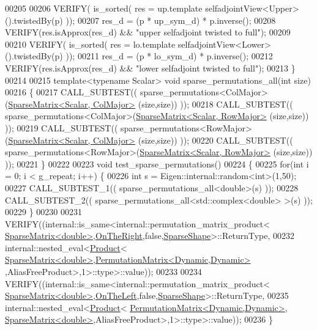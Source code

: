 \begin{DoxyCode}
00205   
00206   VERIFY( is\_sorted( res = up.template selfadjointView<Upper>().twistedBy(p) ));
00207   res\_d = (p * up\_sym\_d) * p.inverse();
00208   VERIFY(res.isApprox(res\_d) && \textcolor{stringliteral}{"upper selfadjoint twisted to full"});
00209   
00210   VERIFY( is\_sorted( res = lo.template selfadjointView<Lower>().twistedBy(p) ));
00211   res\_d = (p * lo\_sym\_d) * p.inverse();
00212   VERIFY(res.isApprox(res\_d) && \textcolor{stringliteral}{"lower selfadjoint twisted to full"});
00213 \}
00214 
00215 \textcolor{keyword}{template}<\textcolor{keyword}{typename} Scalar> \textcolor{keywordtype}{void} sparse\_permutations\_all(\textcolor{keywordtype}{int} size)
00216 \{
00217   CALL\_SUBTEST(( sparse\_permutations<ColMajor>(\hyperlink{group___sparse_core___module}{SparseMatrix<Scalar, ColMajor>}
      (size,size)) ));
00218   CALL\_SUBTEST(( sparse\_permutations<ColMajor>(\hyperlink{group___sparse_core___module}{SparseMatrix<Scalar, RowMajor>}
      (size,size)) ));
00219   CALL\_SUBTEST(( sparse\_permutations<RowMajor>(\hyperlink{group___sparse_core___module}{SparseMatrix<Scalar, ColMajor>}
      (size,size)) ));
00220   CALL\_SUBTEST(( sparse\_permutations<RowMajor>(\hyperlink{group___sparse_core___module}{SparseMatrix<Scalar, RowMajor>}
      (size,size)) ));
00221 \}
00222 
00223 \textcolor{keywordtype}{void} test\_sparse\_permutations()
00224 \{
00225   \textcolor{keywordflow}{for}(\textcolor{keywordtype}{int} i = 0; i < g\_repeat; i++) \{
00226     \textcolor{keywordtype}{int} s = Eigen::internal::random<int>(1,50);
00227     CALL\_SUBTEST\_1((  sparse\_permutations\_all<double>(s) ));
00228     CALL\_SUBTEST\_2((  sparse\_permutations\_all<std::complex<double> >(s) ));
00229   \}
00230 
00231   VERIFY((internal::is\_same<internal::permutation\_matrix\_product<
      \hyperlink{group___sparse_core___module}{SparseMatrix<double>},\hyperlink{group__enums_ggac22de43beeac7a78b384f99bed5cee0ba99dc75d8e00b6c3a5bdc31940f47492b}{OnTheRight},\textcolor{keyword}{false},\hyperlink{struct_eigen_1_1_sparse_shape}{SparseShape}>::ReturnType,
00232                             internal::nested\_eval<\hyperlink{group___core___module_class_eigen_1_1_product}{Product}<
      \hyperlink{group___sparse_core___module}{SparseMatrix<double>},\hyperlink{group___core___module}{PermutationMatrix<Dynamic,Dynamic>}
      ,AliasFreeProduct>,1>::type>::value));
00233 
00234   VERIFY((internal::is\_same<internal::permutation\_matrix\_product<
      \hyperlink{group___sparse_core___module}{SparseMatrix<double>},\hyperlink{group__enums_ggac22de43beeac7a78b384f99bed5cee0ba129609b3bdf23b071f5f86cf2f995ec4}{OnTheLeft},\textcolor{keyword}{false},\hyperlink{struct_eigen_1_1_sparse_shape}{SparseShape}>::ReturnType,
00235                             internal::nested\_eval<\hyperlink{group___core___module_class_eigen_1_1_product}{Product}<
      \hyperlink{group___core___module}{PermutationMatrix<Dynamic,Dynamic>},
      \hyperlink{group___sparse_core___module}{SparseMatrix<double>},AliasFreeProduct>,1>::type>::value));
00236 \}
\end{DoxyCode}
